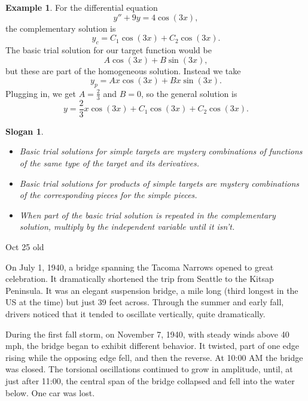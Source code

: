 \documentclass[12pt]{amsart}
\numberwithin{equation}{section}
\theoremstyle{plain} %
\newtheorem{slogan}[equation]{Slogan}
\newcommand{\Oct}[1]{Oct #1 old}
\newcommand{\rsa}{\rightsquigarrow}
\theoremstyle{definition}
\newtheorem{ex}[equation]{Example}
\theoremstyle{remark}
\begin{document}
\begin{ex} For the differential equation
\[ y'' + 9y = 4 \cos(3x),\]
the complementary solution is 
\[ y_c= C_1 \cos(3x) + C_2 \cos(3x).\]
The basic trial solution for our target function would be
\[ A \cos(3x) + B\sin(3x),\]
but these are part of the homogeneous solution. Instead we take
\[ y_p = A x \cos(3x) + B x \sin(3x).\]
Plugging in, we get $A=\frac{2}{3}$ and $B=0$, so the general solution is
\[ y= \frac{2}{3} x \cos(3x) + C_1 \cos(3x) + C_2 \cos(3x).\]
\end{ex}

\begin{slogan}
\begin{itemize}
\item Basic trial solutions for simple targets are mystery combinations of functions of the same type of the target and its derivatives.
\item Basic trial solutions for products of simple targets are mystery combinations of the corresponding pieces for the simple pieces.
\item When part of the basic trial solution is repeated in the complementary solution, multiply by the independent variable until it isn't.
\end{itemize}
\end{slogan}




\Oct{25}

On July 1, 1940, a bridge spanning the Tacoma Narrows opened
to great celebration. It dramatically shortened the trip from Seattle
to the Kitsap Peninsula. It was an elegant suspension bridge, a mile
long (third longest in the US at the time) but just 39 feet across.
Through the summer and early fall, drivers noticed that it tended to
oscillate vertically, quite dramatically. 

During the first fall storm, on November 7, 1940, with steady winds
above 40 mph, the bridge began to exhibit different behavior. It
twisted, part of one edge rising while the opposing edge fell, and then
the reverse. At 10:00 AM the bridge was closed. The torsional oscillations continued to grow in amplitude, until, at just after 11:00, the
central span of the bridge collapsed and fell into the water below. One
car was lost.
\end{document}
